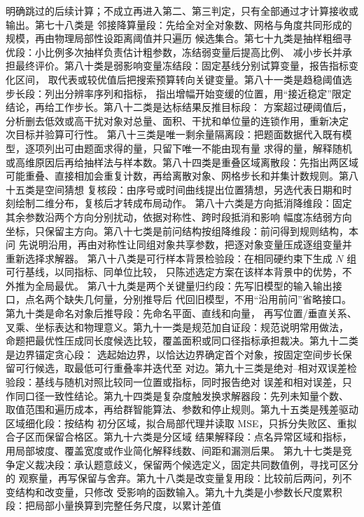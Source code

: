 明确跳过的后续计算；不成立再进入第二、第三判定，只有全部通过才计算接收或输出。第七十八类是
邻接降算量段：先给全对全对象数、网格与角度共同形成的规模，再由物理局部性设距离阈值并只遍历
候选集合。第七十九类是抽样粗细寻优段：小比例多次抽样负责估计粗参数，冻结弱变量后提高比例、
减小步长并承担最终评价。第八十类是弱影响变量冻结段：固定基线分别试算变量，报告指标变化区间，
取代表或较优值后把搜索预算转向关键变量。第八十一类是趋稳阈值选步长段：列出分辨率序列和指标，
指出增幅开始变缓的位置，用“接近稳定”限定结论，再给工作步长。第八十二类是达标结果反推目标段：
方案超过硬阈值后，分析删去低效或高干扰对象对总量、面积、干扰和单位量的连锁作用，重新决定
次目标并验算可行性。
第八十三类是唯一剩余量隔离段：把题面数据代入既有模型，逐项列出可由题面求得的量，只留下唯一不能由现有量
求得的量，解释随机或高维原因后再给抽样法与样本数。第八十四类是重叠区域离散段：先指出两区域
可能重叠、直接相加会重复计数，再给离散对象、网格步长和并集计数规则。第八十五类是空间猜想
复核段：由序号或时间曲线提出位置猜想，另选代表日期和时刻绘制二维分布，复核后才转成布局动作。
第八十六类是方向抵消降维段：固定其余参数沿两个方向分别扰动，依据对称性、跨时段抵消和影响
幅度冻结弱方向坐标，只保留主方向。第八十七类是前问结构按组降维段：前问得到规则结构，本问
先说明沿用，再由对称性让同组对象共享参数，把逐对象变量压成逐组变量并重新选择求解器。
第八十八类是可行样本背景检验段：在相同硬约束下生成 $N$ 组可行基线，以同指标、同单位比较，
只陈述选定方案在该样本背景中的优势，不外推为全局最优。
第八十九类是两个关键量归约段：先写旧模型的输入输出接口，点名两个缺失几何量，分别推导后
代回旧模型，不用“沿用前问”省略接口。第九十类是命名对象后推导段：先命名平面、直线和向量，
再写位置/垂直关系、叉乘、坐标表达和物理意义。第九十一类是规范加自证段：规范说明常用做法，
命题把最优性压成同长度候选比较，覆盖面积或同口径指标承担裁决。第九十二类是边界锚定贪心段：
选起始边界，以恰达边界确定首个对象，按固定空间步长保留可行候选，取最低可行重叠率并迭代至
对边。第九十三类是绝对--相对双误差检验段：基线与随机对照比较同一位置或指标，同时报告绝对
误差和相对误差，只作同口径一致性结论。第九十四类是复杂度触发换求解器段：先列未知量个数、
取值范围和遍历成本，再给群智能算法、参数和停止规则。第九十五类是残差驱动区域细化段：按结构
初分区域，拟合局部代理并读取 MSE，只拆分失败区、重拟合子区而保留合格区。第九十六类是分区域
结果解释段：点名异常区域和指标，用局部坡度、覆盖宽度或作业简化解释线数、间距和漏测后果。
第九十七类是竞争定义裁决段：承认题意歧义，保留两个候选定义，固定共同数值例，寻找可区分的
观察量，再写保留与舍弃。第九十八类是改变量复用段：比较前后两问，列不变结构和改变量，只修改
受影响的函数输入。第九十九类是小参数长尺度累积段：把局部小量换算到完整任务尺度，以累计差值
